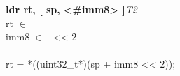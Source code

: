 


\begin{instructionblock}{\imagewidth}%
    \textbf{ldr rt, [ sp, <\#imm8> ]}\hfill\textit{T2}\\
    rt $\in$ \baseregisters\\
    imm8 $\in$ \immEight\ {<}{<} 2\\
    {}\\
    rt = *((uint32\_t*)(sp + imm8 {<}{<} 2));
\end{instructionblock}

